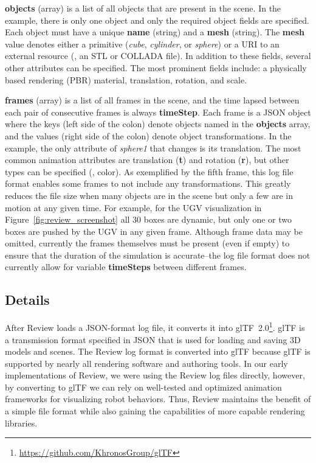 \textbf{objects} (array) is a list of all objects that are present in the scene. In the example, there is only one object and only the required object fields are specified.
%
Each object must have a unique \textbf{name} (string) and a \textbf{mesh} (string).
%
The \textbf{mesh} value denotes either a primitive (\emph{cube}, \emph{cylinder}, or \emph{sphere}) or a URI to an external resource (\eg{}, an STL or COLLADA file).
%
In addition to these fields, several other attributes can be specified. The most prominent fields include: a physically based rendering (PBR) material, translation, rotation, and scale.


\textbf{frames} (array) is a list of all frames in the scene, and the time lapsed between each pair of consecutive frames is always \textbf{timeStep}.
%
Each frame is a JSON object where the keys (left side of the colon) denote objects named in the \textbf{objects} array, and the values (right side of the colon) denote object transformations.
%
In the example, the only attribute of \emph{sphere1} that changes is its translation. The most common animation attributes are translation (\textbf{t}) and rotation (\textbf{r}), but other types can be specified (\eg{}, color).
%
As exemplified by the fifth frame, this log file format enables some frames to not include any transformations. This greatly reduces the file size when many objects are in the scene but only a few are in motion at any given time.
%
For example, for the UGV visualization in Figure~\ref{fig:review_screenshot} all 30 boxes are dynamic, but only one or two boxes are pushed by the UGV in any given frame.
%
Although frame data may be omitted, currently the frames themselves must be present (even if empty) to ensure that the duration of the simulation is accurate--the log file format does not currently allow for variable \textbf{timeSteps} between different frames.



\subsection{Details}

After Review loads a JSON-format log file, it converts it into glTF~2.0\footnote{\url{https://github.com/KhronosGroup/glTF}}.
%
glTF is a transmission format specified in JSON that is used for loading and saving 3D models and scenes.
%
The Review log format is converted into glTF because glTF is supported by nearly all rendering software and authoring tools.
%
In our early implementations of Review, we were using the Review log files directly, however, by converting to glTF we can rely on well-tested and optimized animation frameworks for visualizing robot behaviors.
%
Thus, Review maintains the benefit of a simple file format while also gaining the capabilities of more capable rendering libraries.


